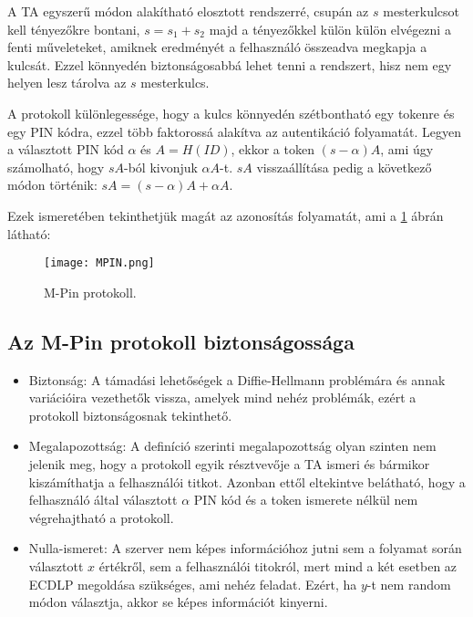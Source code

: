 A TA egyszerű módon alakítható elosztott rendszerré, csupán az $s$ mesterkulcsot kell tényezőkre bontani, $s = s_1 + s_2$ majd a tényezőkkel külön külön elvégezni a fenti műveleteket, amiknek eredményét a felhasználó összeadva megkapja a kulcsát. Ezzel könnyedén biztonságosabbá lehet tenni a rendszert, hisz nem egy helyen lesz tárolva az $s$ mesterkulcs.

A protokoll különlegessége, hogy a kulcs könnyedén szétbontható egy tokenre és egy PIN kódra, ezzel több faktorossá alakítva az autentikáció folyamatát. Legyen a választott PIN kód $\alpha$ és $A = H(ID)$, ekkor a token $(s - \alpha)A$, ami úgy számolható, hogy $sA$-ból kivonjuk $\alpha A$-t. $sA$ visszaállítása pedig a következő módon történik: $sA = (s - \alpha)A + \alpha A$.

Ezek ismeretében tekinthetjük magát az azonosítás folyamatát, ami a \ref{Figure::MPIN} ábrán látható:

\begin{figure}[H]
    \centering
    \texttt{[image: MPIN.png]}
    \caption{M-Pin protokoll.}
    \label{Figure::MPIN}
\end{figure}

\subsection{Az M-Pin protokoll biztonságossága}

\begin{itemize}
    \item Biztonság: A támadási lehetőségek a Diffie-Hellmann problémára és annak variációira vezethetők vissza, amelyek mind nehéz problémák, ezért a protokoll biztonságosnak tekinthető.
    \item Megalapozottság: A definíció szerinti megalapozottság olyan szinten nem jelenik meg, hogy a protokoll egyik résztvevője a TA ismeri és bármikor kiszámíthatja a felhasználói titkot. Azonban ettől eltekintve belátható, hogy a felhasználó által választott $\alpha$ PIN kód és a token ismerete nélkül nem végrehajtható a protokoll.
    \item Nulla-ismeret: A szerver nem képes információhoz jutni sem a folyamat során választott $x$ értékről, sem a felhasználói titokról, mert mind a két esetben az ECDLP megoldása szükséges, ami nehéz feladat. Ezért, ha $y$-t nem random módon választja, akkor se képes információt kinyerni.
\end{itemize}
